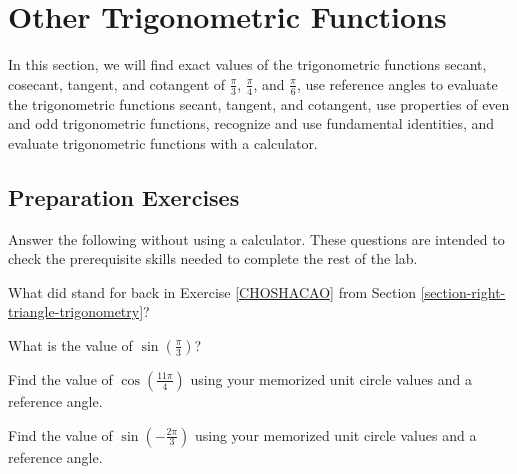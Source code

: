 
\section{Other Trigonometric Functions} \label{section-other-trigonometric-functions}
In this section, we will find exact values of the trigonometric functions secant, cosecant, tangent, and cotangent of $\frac{\pi}{3}$, $\frac{\pi}{4}$, and $\frac{\pi}{6}$, use reference angles to evaluate the trigonometric functions secant, tangent, and cotangent, use properties of even and odd trigonometric functions, recognize and use fundamental identities, and evaluate trigonometric functions with a calculator.


\subsection*{Preparation Exercises} \label{preparation-exercises-section-other-trigonometric-functions}

Answer the following without using a calculator. These questions are intended to check the prerequisite skills needed to complete the rest of the lab.

\begin{myPrep}
	What did  stand for back in Exercise \ref{CHOSHACAO} from Section \ref{section-right-triangle-trigonometry}?
\end{myPrep}
\vfill

\begin{myPrep}
	What is the value of $\sin\left(\frac{\pi}{3}\right)$?
\end{myPrep}
\vfill

\begin{myPrep}
	Find the value of $\cos\left(\frac{11\pi}{4}\right)$ using your memorized unit circle values and a reference angle.
\end{myPrep}
\vfill

\begin{myPrep}
	Find the value of $\sin\left(-\frac{2\pi}{3}\right)$ using your memorized unit circle values and a reference angle.
\end{myPrep}
\vfill

